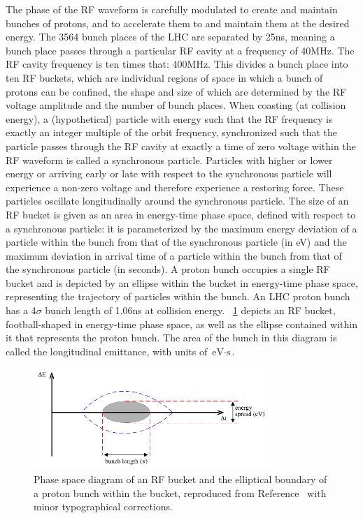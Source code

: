 The phase of the RF waveform is carefully modulated to create and maintain bunches of protons, and to accelerate them to and maintain them at the desired energy.
The 3564 bunch places of the LHC are separated by 25\unit{ns}, meaning a bunch place passes through a particular RF cavity at a frequency of 40\unit{MHz}.
The RF cavity frequency is ten times that: 400\unit{MHz}.
This divides a bunch place into ten RF buckets, which are individual regions of space in which a bunch of protons can be confined, the shape and size of which are determined by the RF voltage amplitude and the number of bunch places.
When coasting (at collision energy), a (hypothetical) particle with energy such that the RF frequency is exactly an integer multiple of the orbit frequency, synchronized such that the particle passes through the RF cavity at exactly a time of zero voltage within the RF waveform is called a synchronous particle.
Particles with higher or lower energy or arriving early or late with respect to the synchronous particle will experience a non-zero voltage and therefore experience a restoring force.
These particles oscillate longitudinally around the synchronous particle.
The size of an RF bucket is given as an area in energy-time phase space, defined with respect to a synchronous particle: it is parameterized by the maximum energy deviation of a particle within the bunch from that of the synchronous particle (in \unit{eV}) and the maximum deviation in arrival time of a particle within the bunch from that of the synchronous particle (in seconds).
A proton bunch occupies a single RF bucket and is depicted by an ellipse within the bucket in energy-time phase space, representing the trajectory of particles within the bunch.
An LHC proton bunch has a 4$\sigma$ bunch length of 1.06\unit{ns} at collision energy.
\Fig~\ref{cms:rfbucket} depicts an RF bucket, football-shaped in energy-time phase space, as well as the ellipse contained within it that represents the proton bunch. The area of the bunch in this diagram is called the longitudinal emittance, with units of $\text{eV}\cdot\text{s}$.

\begin{figure}[tpb]
  \centering
  \includegraphics[width=0.8\textwidth]{figures/cms/RFBucket.pdf}
  \caption{Phase space diagram of an RF bucket and the elliptical boundary of a proton bunch within the bucket, reproduced from Reference~\cite{Baird:1017689} with minor typographical corrections.}
  \label{cms:rfbucket}
\end{figure}

